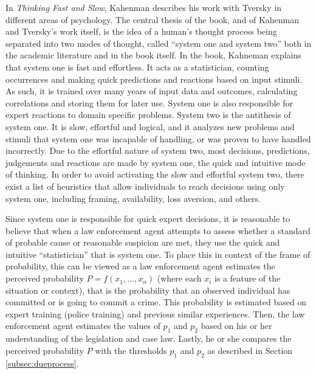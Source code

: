 \documentclass[12pt]{article} %
\begin{document}
In \textit{Thinking Fast and Slow}, Kahenman describes his work with Tversky in different areas of psychology. The central thesis of the book, and of Kahenman and Tversky's work itself, is the idea of a human's thought process being separated into two modes of thought, called ``system one and system two'' both in the academic literature and in the book itself. In the book, Kahneman explains that system one is fast and effortless. It acts as a statistician, counting occurrences and making quick predictions and reactions based on input stimuli. As such, it is trained over many years of input data and outcomes, calculating correlations and storing them for later use. System one is also responsible for expert reactions to domain specific problems. System two is the antithesis of system one. It is slow, effortful and logical, and it analyzes new problems and stimuli that system one was incapable of handling, or was proven to have handled incorrectly. Due to the effortful nature of system two, most decisions, predictions, judgements and reactions are made by system one, the quick and intuitive mode of thinking. In order to avoid activating the slow and effortful system two, there exist a list of heuristics that allow individuals to reach decisions using only system one, including framing, availability, loss aversion, and others.

Since system one is responsible for quick expert decisions, it is reasonable to believe that when a law enforcement agent attempts to assess whether a standard of probable cause or reasonable suspicion are met, they use the quick and intuitive ``statistician'' that is system one. To place this in context of the frame of probability, this can be viewed as a law enforcement agent estimates the perceived probability $P = f(x_1,...,x_n)$ (where each $x_i$ is a feature of the situation or context), that is the probability that an observed individual has committed or is going to commit a crime. This probability is estimated based on expert training (police training) and previous similar experiences. Then, the law enforcement agent estimates the values of $p_1$ and $p_2$ based on his or her understanding of the legislation and case law. Lastly, he or she compares the perceived probability $P$ with the thresholds $p_1$ and $p_2$ as described in Section \ref{subsec:dueprocess}.

\end{document}
